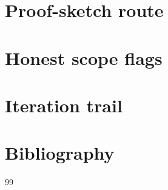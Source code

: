 \documentclass[11pt]{article}
\theoremstyle{definition}
\theoremstyle{plain}
\theoremstyle{remark}
\begin{document}
\section{Proof-sketch route}

\section{Honest scope flags}

\section{Iteration trail}

\section*{Bibliography}
\begin{thebibliography}{99}
\end{thebibliography}
\end{document}
